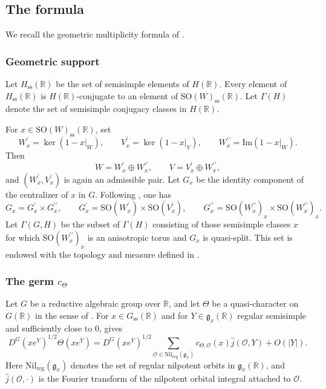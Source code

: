 \documentclass[12pt]{amsart}
\numberwithin{equation}{subsection}
\newcommand{\BR}{{\mathbb {R}}}
\newcommand{\CO}{{\mathcal {O}}}
\newcommand{\Fg}{{\mathfrak {g}}}
\renewcommand{\Im}{{\mathrm{Im}}}
\newcommand{\reg}{{\mathrm{reg}}}
\newcommand{\SO}{{\mathrm{SO}}}
\def\nil{\mathrm{Nil}}
\def\Gam{{\Gamma}}
\def\p{\prime}
\def\ss{\mathrm{ss}}
\def\SO{\mathrm{SO}}
\begin{document}
\subsection{The formula}\label{subsec:theformula}

We recall the geometric multiplicity formula of \cite[\S 7.3]{thesis_zhilin}.

\subsubsection{Geometric support}

Let $H_\ss(\BR)$ be the set of semisimple elements of $H(\BR)$. Every element
of $H_\ss(\BR)$ is $H(\BR)$-conjugate to an element of $\SO(W)_\ss(\BR)$.
Let $\Gam(H)$ denote the set of semisimple conjugacy classes in $H(\BR)$.

For $x\in \SO(W)_\ss(\BR)$, set
\[
W^\p_x=\ker(1-x|_W),\qquad
V^\p_x=\ker(1-x|_V),\qquad
W^{\p\p}_x=\Im(1-x|_W).
\]
Then
\[
W=W^\p_x\oplus W^{\p\p}_x,
\qquad
V=V^\p_x\oplus W^{\p\p}_x,
\]
and $(W^\p_x,V^\p_x)$ is again an admissible pair. Let $G_x$ be the identity
component of the centralizer of $x$ in $G$. Following
\cite[\S 7.3.1]{thesis_zhilin}, one has
\begin{equation}\label{eq:formulaGxdecomp}
G_x=G^\p_x\times G^{\p\p}_x,
\qquad
G^\p_x=\SO(W^\p_x)\times \SO(V^\p_x),
\qquad
G^{\p\p}_x=\SO(W^{\p\p}_x)_x\times \SO(W^{\p\p}_x)_x .
\end{equation}
Let $\Gam(G,H)$ be the subset of $\Gam(H)$ consisting of those semisimple
classes $x$ for which $\SO(W^{\p\p}_x)_x$ is an anisotropic torus and $G_x$ is
quasi-split. This set is endowed with the topology and measure defined in
\cite[(7.3.3)]{thesis_zhilin}.

\subsubsection{The germ $c_\Theta$}

Let $G$ be a reductive algebraic group over $\BR$, and let $\Theta$ be a
quasi-character on $G(\BR)$ in the sense of \cite[\S 4.4]{beuzart2015local}.
For $x\in G_\ss(\BR)$ and for $Y\in \Fg_x(\BR)$ regular semisimple and
sufficiently close to $0$, \cite[Prop.~4.4~(vi)]{beuzart2015local} gives
\[
D^G(xe^Y)^{1/2}\Theta(xe^Y)
=
D^G(xe^Y)^{1/2}
\sum_{\CO\in \nil_\reg(\Fg_x)}
c_{\Theta,\CO}(x)\widehat{j}(\CO,Y)
+
O(|Y|).
\]
Here $\nil_\reg(\Fg_x)$ denotes the set of regular nilpotent orbits in
$\Fg_x(\BR)$, and $\widehat{j}(\CO,\cdot)$ is the Fourier transform of the
nilpotent orbital integral attached to $\CO$.
\end{document}

